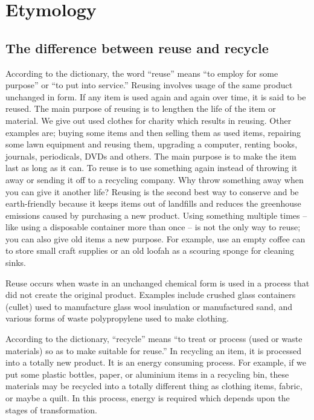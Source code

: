 \documentclass[12pt]{article}
\begin{document}
\section{Etymology}
\subsection{The difference between reuse and recycle}
According to the dictionary, the word “reuse” means “to employ for some purpose” or “to put into service.” Reusing involves usage of the same product unchanged in form. If any item is used again and again over time, it is said to be reused. The main purpose of reusing is to lengthen the life of the item or material. We give out used clothes for charity which results in reusing. Other examples are; buying some items and then selling them as used items, repairing some lawn equipment and reusing them, upgrading a computer, renting books, journals, periodicals, DVDs and others. The main purpose is to make the item last as long as it can. To reuse is to use something again instead of throwing it away or sending it off to a recycling company. Why throw something away when you can give it another life? Reusing is the second best way to conserve and be earth-friendly because it keeps items out of landfills and reduces the greenhouse emissions caused by purchasing a new product. Using something multiple times -- like using a disposable container more than once -- is not the only way to reuse; you can also give old items a new purpose. For example, use an empty coffee can to store small craft supplies or an old loofah as a scouring sponge for cleaning sinks.

Reuse occurs when waste in an unchanged chemical form is used in a process that did not create the original product. Examples include crushed glass containers (cullet) used to manufacture glass wool insulation or manufactured sand, and various forms of waste polypropylene used to make clothing.

According to the dictionary, “recycle” means “to treat or process (used or waste materials) so as to make suitable for reuse.” In recycling an item, it is processed into a totally new product. It is an energy consuming process. For example, if we put some plastic bottles, paper, or aluminium items in a recycling bin, these materials may be recycled into a totally different thing as clothing items, fabric, or maybe a quilt. In this process, energy is required which depends upon the stages of transformation.
\end{document}
